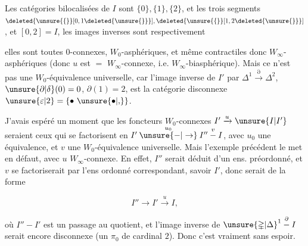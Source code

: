 Les catégories bilocalisées de $I$ sont  $\{0\},\{1\},\{2\}$, et les trois segments $\deleted{\unsure{\{}}[0,1\deleted{\unsure{\}}}],\deleted{\unsure{\{}}[1,2\deleted{\unsure{\}}}]$, et $[0,2]=I$, les images inverses sont respectivement


elles sont toutes $0$-connexes,  \deleted{\unsure{$=$}} $W_0$-asphériques, et même  contractiles donc $W_\infty$-asphériques (donc $u$ est $=$ $W_\infty$-connexe, i.e. $W_\infty$-biasphérique). Mais ce n'est pas une $W_0$-équivalence universelle, car l'image inverse de $I'$ par $\mathbb{\Delta}^1\xrightarrow{\partial}\mathbb{\Delta}^2$, $\unsure{\partial|\delta}(0)=0$, $\partial(1)=2$,
est la catégorie disconnexe $\unsure{\varepsilon|2}=\{\bullet\ \unsure{\bullet|{,}}\}$.

J'avais espéré un moment que les foncteurs $W_0$-connexes $I'\xrightarrow{u}\unsure{I|I'}$ seraient ceux qui se factorisent en $I'\overset{u_0}{\mathbin{\unsure{-|\to}}}I''\overset{v}{\mathbin{-}}I$, avec  $u_0$ une équivalence, et $v$ une $W_0$-équivalence universelle. Mais l'exemple précédent le met en défaut, avec $u$   $W_\infty$-connexe. En effet, $I''$ serait  déduit d'un ens. préordonné, et $v$ se factoriserait par l'ens ordonné correspondant, savoir $I'$, donc serait de la forme

\[
 I''\longrightarrow I'\xrightarrow{u}I,
\]

où $I''\mathbin{-}I'$ est un passage au quotient, et l'image inverse de $\unsure{\mathbb{\Delta}|\Delta}^1\overset{\partial}{\mathbin{-}}I$ serait encore disconnexe (un $\pi_0$ de cardinal $2$). Donc c'est vraiment sans espoir.

